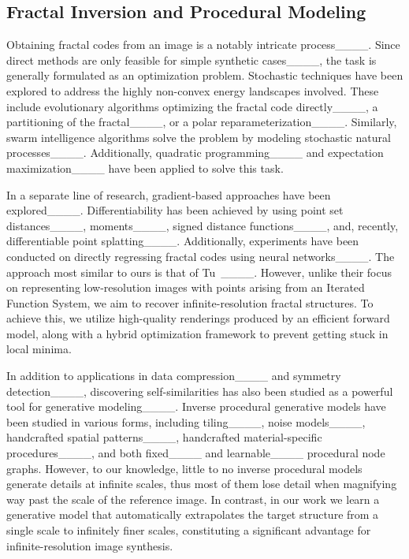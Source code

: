 \subsection{Fractal Inversion and Procedural Modeling}
\label{sec:fractal_inversion}

Obtaining fractal codes from an image is a notably intricate process____. 
Since direct methods are only feasible for simple synthetic cases____, the task is generally formulated as an optimization problem.
Stochastic techniques have been explored to address the highly non-convex energy landscapes involved.
These include evolutionary algorithms optimizing the fractal code directly____, a partitioning of the fractal____, or a polar reparameterization____.
Similarly, swarm intelligence algorithms solve the problem by modeling stochastic natural processes____.
Additionally, quadratic programming____ and expectation maximization____ have been applied to solve this task.

In a separate line of research, gradient-based approaches have been explored____. 
Differentiability has been achieved by using point set distances____, moments____, signed distance functions____, and, recently, differentiable point splatting____. Additionally, experiments have been conducted on directly regressing fractal codes using neural networks____.
The approach most similar to ours is that of Tu~\etal____. However, unlike their focus on representing low-resolution images with points arising from an Iterated Function System, we aim to recover infinite-resolution fractal structures.
To achieve this, we utilize high-quality renderings produced by an efficient forward model, along with a hybrid optimization framework to prevent getting stuck in local minima.

In addition to applications in data compression____ and symmetry detection____, discovering self-similarities has also been studied as a powerful tool for generative modeling____.
Inverse procedural generative models have been studied in various forms, including tiling____, noise models____, handcrafted spatial patterns____, handcrafted material-specific procedures____, and both fixed____ and learnable____ procedural node graphs. However, to our knowledge, little to no inverse procedural models generate details at infinite scales, thus most of them lose detail when magnifying way past the scale of the reference image.
In contrast, in our work we learn a generative model that automatically extrapolates the target structure from a single scale to infinitely finer scales, constituting a significant advantage for infinite-resolution image synthesis.

